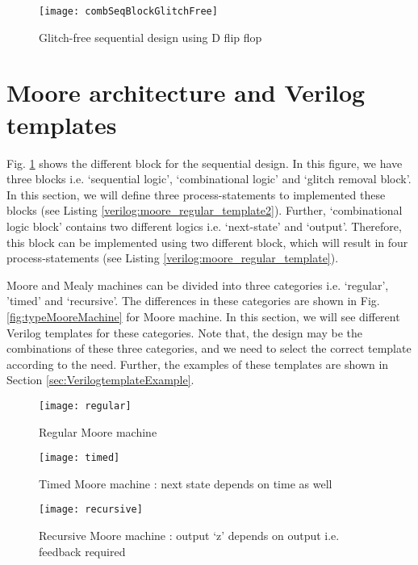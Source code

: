 \begin{figure}[!h]
	\centering
	\texttt{[image: combSeqBlockGlitchFree]}
	\caption{Glitch-free sequential design using D flip flop}
	\label{fig:combSeqBlockGlitchFree}
\end{figure}


\section{Moore architecture and Verilog templates} \label{sec:MooreTemplates}
Fig. \ref{fig:combSeqBlockGlitchFree} shows the different block for the sequential design. In this figure, we have three blocks i.e. `sequential logic', `combinational logic' and `glitch removal block'. In this section, we will define three process-statements to implemented these blocks (see Listing \ref{verilog:moore_regular_template2}). Further, `combinational logic block' contains two different logics i.e. `next-state' and `output'. Therefore, this block can be implemented using two different block, which will result in four process-statements (see Listing \ref{verilog:moore_regular_template}). 

Moore and Mealy machines can be divided into three categories i.e. `regular', 'timed' and `recursive'. The differences in these categories are shown in Fig. \ref{fig:typeMooreMachine} for Moore machine. In this section, we will see different Verilog templates for these categories. Note that, the design may be the combinations of these three categories, and we need to select the correct template according to the need. Further, the examples of these templates are shown in Section \ref{sec:VerilogtemplateExample}.


\begin{figure*}[!h]
	\begin{subfigure}[t]{1\textwidth}
		\centering
		\texttt{[image: regular]}
		\caption{Regular Moore machine}
		\label{subfig:regular}
	\end{subfigure} %
	\begin{subfigure}[t]{1\textwidth}
		\centering
		\texttt{[image: timed]}
		\caption{Timed Moore machine : next state depends on time as well}
		\label{subfig:timed}
	\end{subfigure}	
	
	\begin{subfigure}[t]{1\textwidth}
		\centering
		\texttt{[image: recursive]}
		\caption{Recursive Moore machine : output `z' depends on output i.e. feedback required}
		\label{subfig:recursive}
	\end{subfigure}	
	\caption{Different types of FSM}
	\label{fig:typeMooreMachine}%
\end{figure*}


